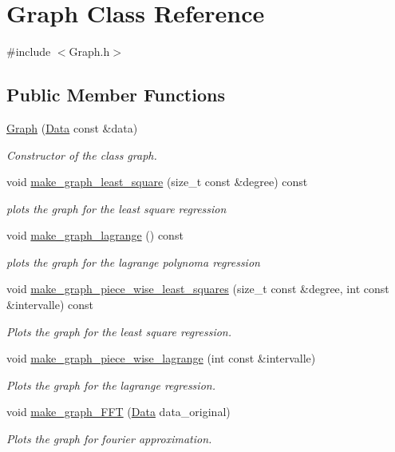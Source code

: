 \hypertarget{class_graph}{}\section{Graph Class Reference}
\label{class_graph}


{\ttfamily \#include $<$Graph.\+h$>$}

\subsection*{Public Member Functions}
\begin{DoxyCompactItemize}
\item 
\mbox{\hyperlink{class_graph_ac2cc4f7971589f9674f4fbf3b7dc200c}{Graph}} (\mbox{\hyperlink{struct_data}{Data}} const \&data)
\begin{DoxyCompactList}\small\item\em Constructor of the class graph. \end{DoxyCompactList}\item 
void \mbox{\hyperlink{class_graph_af3560cb4e5eaa08c33e3de253a4e60a3}{make\+\_\+graph\+\_\+least\+\_\+square}} (size\+\_\+t const \&degree) const
\begin{DoxyCompactList}\small\item\em plots the graph for the least square regression \end{DoxyCompactList}\item 
void \mbox{\hyperlink{class_graph_a5fd01460d3981748a22269f9953d3486}{make\+\_\+graph\+\_\+lagrange}} () const
\begin{DoxyCompactList}\small\item\em plots the graph for the lagrange polynoma regression \end{DoxyCompactList}\item 
void \mbox{\hyperlink{class_graph_a00bb733092d1c97735b6fbc767a8cedf}{make\+\_\+graph\+\_\+piece\+\_\+wise\+\_\+least\+\_\+squares}} (size\+\_\+t const \&degree, int const \&intervalle) const
\begin{DoxyCompactList}\small\item\em Plots the graph for the least square regression. \end{DoxyCompactList}\item 
void \mbox{\hyperlink{class_graph_a4de7bd5074f188b470392920df1c7ada}{make\+\_\+graph\+\_\+piece\+\_\+wise\+\_\+lagrange}} (int const \&intervalle)
\begin{DoxyCompactList}\small\item\em Plots the graph for the lagrange regression. \end{DoxyCompactList}\item 
void \mbox{\hyperlink{class_graph_a5326be30b090c2ba956d0e0211895fcd}{make\+\_\+graph\+\_\+\+F\+FT}} (\mbox{\hyperlink{struct_data}{Data}} data\+\_\+original)
\begin{DoxyCompactList}\small\item\em Plots the graph for fourier approximation. \end{DoxyCompactList}\end{DoxyCompactItemize}


